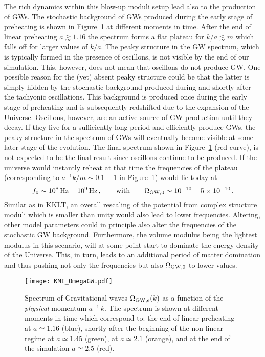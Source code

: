 \documentclass[12pt]{article}
\newcommand{\be}{\begin{equation}}
\newcommand{\ee}{\end{equation}}
\begin{document}
The rich dynamics within this blow-up moduli setup lead also to the production of GWs. The stochastic background of GWs produced during the early stage of preheating is shown in Figure~\ref{fig:KMI_GW_spec} at different moments in time. After the end of linear preheating $a\gtrsim1.16$ the spectrum forms a flat plateau for $k/a\lesssim m$ which falls off for larger values of $k/a$. The peaky structure in the GW spectrum, which is typically formed in the presence of oscillons, is not visible by the end of our simulation. This, however, does not mean that oscillons do not produce GW. One possible reason for the (yet) absent peaky structure could be that the latter is simply hidden by the stochastic background produced during and shortly after the tachyonic oscillations. This background is produced once during the early stage of preheating and is subsequently redshifted due to the expansion of the Universe. Oscillons, however, are an active source of GW production until they decay. If they live for a sufficiently long period and efficiently produce GWs, the peaky structure in the spectrum of GWs will eventually become visible at some later stage of the evolution. The final spectrum shown in Figure~\ref{fig:KMI_GW_spec} (red curve), is not expected to be the final result since oscillons continue to be produced. If the universe would instantly reheat at that time the frequencies of the plateau (corresponding to $a^{-1}k/m \sim 0.1-1$ in Figure~\ref{fig:KMI_GW_spec}) would lie today at
\be
f_0\sim10^8\,\rm{Hz} - 10^9\,\rm{Hz}\,,\qquad \textrm{with}\qquad\Omega_{\rm{GW},0} \sim 10^{-10} - 5\times10^{-10}\,.
\ee
Similar as in KKLT, an overall rescaling of the potential from complex structure moduli which is smaller than unity would also lead to lower frequencies. Altering, other model parameters could in principle also alter the frequencies of the stochastic GW background. Furthermore, the volume modulus being the lightest modulus in this scenario, will at some point start to dominate the energy density of the Universe. This, in turn, leads to an additional period of matter domination and thus pushing not only the frequencies but also $\Omega_{\rm{GW},0}$ to lower values.
 



\begin{figure}
\begin{center}\texttt{[image: KMI\_OmegaGW.pdf]}
\end{center}
\caption{Spectrum of Gravitational waves $\Omega_{\rm GW, \rm e}(k)$ as a function of the \textit{physical} momentum $a^{-1}\,k$. The spectrum is shown at different moments in time which correspond to: the end of linear preheating at $a\simeq1.16$ (blue), shortly after the beginning of the non-linear regime at $a\simeq1.45$ (green), at $a\simeq2.1$ (orange), and at the end of the simulation $a\simeq2.5$ (red).}
\label{fig:KMI_GW_spec}
\end{figure}
\end{document}
